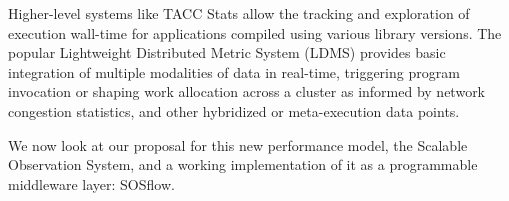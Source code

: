 Higher-level systems like TACC Stats \cite{evans2014comprehensive}
allow the tracking and exploration of execution wall-time for
applications compiled using various library versions.
%
The popular Lightweight Distributed Metric System (LDMS)
\cite{agelastos2014lightweight} provides basic integration of multiple
modalities of data in real-time, triggering program invocation or
shaping work allocation across a cluster as informed by network
congestion statistics, and other hybridized or meta-execution data
points.





We now look at our proposal for this new performance model, the
Scalable Observation System, and a working implementation of it
as a programmable middleware layer: SOSflow.



